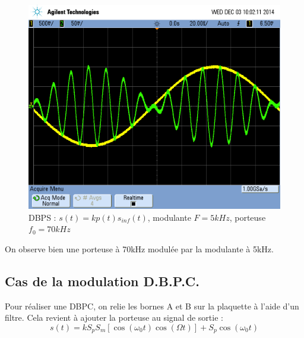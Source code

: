 \documentclass[../../Cours_M1.tex]{subfiles}
\begin{document}
\begin{itemize}
\begin{figure}[h!]
\centering
\includegraphics[scale=0.2]{DBPS705.png}
\caption{DBPS : $s(t)=kp(t)s_{inf}(t)$, modulante $F=5kHz$, porteuse $f_0=70kHz$}
\end{figure}

On observe bien une porteuse à 70kHz modulée par la modulante à 5kHz.
\end{itemize}



\subsection{Cas de la modulation D.B.P.C.}

Pour réaliser une DBPC, on relie les bornes A et B sur la plaquette à l'aide d'un filtre. Cela revient à ajouter la porteuse au signal de sortie :
\[s(t) = kS_pS_m[\cos(\omega_0 t)\cos(\Omega t)]+S_p\cos(\omega_0 t)\]
\end{document}
